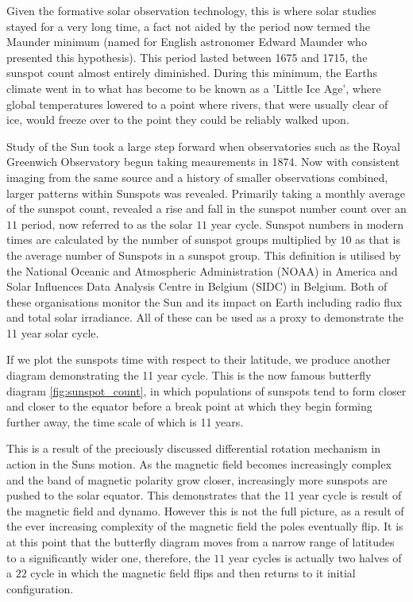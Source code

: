 Given the formative solar observation technology, this is where solar studies stayed for a very long time, a fact not aided by the period now termed the Maunder minimum (named for English astronomer Edward Maunder who presented this hypothesis).
This period lasted between 1675 and 1715, the sunspot count almost entirely diminished.
During this minimum, the Earths climate went in to what has become to be known as a 'Little Ice Age', where global temperatures lowered to a point where rivers, that were usually clear of ice, would freeze over to the point they could be reliably walked upon.

Study of the Sun took a large step forward when observatories such as the Royal Greenwich Observatory begun taking meaurements in 1874.
Now with consistent imaging from the same source and a history of smaller observations combined, larger patterns within Sunspots was revealed.
Primarily taking a monthly average of the sunspot count, revealed a rise and fall in the sunspot number count over an $11$ period, now referred to as the solar $11$ year cycle.
Sunspot numbers in modern times are calculated by the number of sunspot groups multiplied by $10$ as that is the average number of Sunspots in a sunspot group.
This definition is utilised by the National Oceanic and Atmospheric Administration (NOAA) in America and Solar Influences Data Analysis Centre in Belgium (SIDC) in Belgium.
Both of these organisations monitor the Sun and its impact on Earth including radio flux and total solar irradiance.
All of these can be used as a proxy to demonstrate the 11 year solar cycle.

If we plot the sunspots time with respect to their latitude, we produce another diagram demonstrating the 11 year cycle.
This is the now famous butterfly diagram \ref{fig:sunspot_count}, in which populations of sunspots tend to form closer and closer to the equator before a break point at which they begin forming further away, the time scale of which is 11 years.

This is a result of the preciously discussed differential rotation mechanism in action in the Suns motion.
As the magnetic field becomes increasingly complex and the band of magnetic polarity grow closer, increasingly more sunspots are pushed to the solar equator.
This demonstrates that the 11 year cycle is result of the magnetic field and dynamo.
However this is not the full picture, as a result of the ever increasing complexity of the magnetic field the poles eventually flip.
It is at this point that the butterfly diagram moves from a narrow range of latitudes to a significantly wider one, therefore, the $11$ year cycles is actually two halves of a $22$ cycle in which the magnetic field flips and then returns to it initial configuration.

